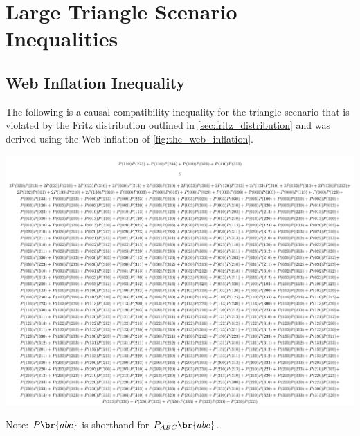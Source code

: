\documentclass[aps, 10pt, english, twoside, pra, nofootinbib, tightenlines, longbibliography]{revtex4-1}
\begin{document}
    \clearpage
    \section{Large Triangle Scenario Inequalities}
    \subsection{Web Inflation Inequality}
    \label{sec:web_inequality}
    The following is a causal compatibility inequality for the triangle scenario that is violated by the Fritz distribution outlined in \cref{sec:fritz_distribution} and was derived using the Web inflation of \cref{fig:the_web_inflation}.
    \begin{center}
        \includegraphics[width=\linewidth]{../../figures/inequalities/no_symwitness_ineq_print_standalone}
    \end{center}
    Note: $\prob\br{abc}$ is shorthand for $\prob[ABC]\br{abc}$.
    \clearpage
\end{document}
